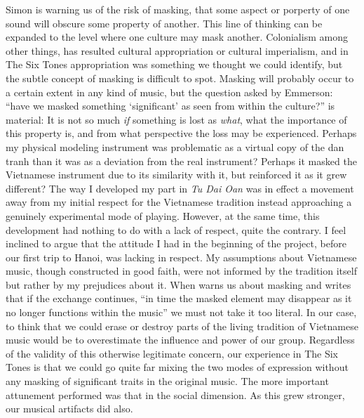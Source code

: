 \documentclass[a4paper]{article}
\begin{document}
Simon \citet{emmerson06} is warning us of the risk of masking, that some aspect or porperty of one sound will obscure some property of another. This line of thinking can be expanded to the level where one culture may mask another. Colonialism among other things, has resulted cultural appropriation or cultural imperialism, and in The Six Tones appropriation was something we thought we could identify, but the subtle concept of masking is difficult to spot.
Masking will probably occur to a certain extent in any kind of music, but the question asked by Emmerson: ``have we masked something ‘significant’ as seen from within the culture?'' is material: It is not so much \emph{if} something is lost as \emph{what}, what the importance of this property is, and from what perspective the loss may be experienced. Perhaps my physical modeling instrument was problematic as a virtual copy of the dan tranh than it was as a deviation from the real instrument? Perhaps it masked the Vietnamese instrument due to its similarity with it, but reinforced it as it grew different? 
The way I developed my part in \emph{Tu Dai Oan} was in effect a movement away from my initial respect for the Vietnamese tradition instead approaching a genuinely experimental mode of playing. However, at the same time, this development had nothing to do with a lack of respect, quite the contrary. I feel inclined to argue that the attitude I had in the beginning of the project, before our first trip to Hanoi, was lacking in respect. My assumptions about Vietnamese music, though constructed in good faith, were not informed by the tradition itself but rather by my prejudices about it.
When \citet{emmerson06} warns us about masking and writes that if the exchange continues, ``in time the masked element may disappear as it no longer functions within the music'' we must not take it too literal. In our case, to think that we could erase or destroy parts of the living tradition of Vietnamese music would be to overestimate the influence and power of our group. Regardless of the validity of this otherwise legitimate concern, our experience in The Six Tones is that we could go quite far mixing the two modes of expression without any masking of significant traits in the original music. The more important attunement performed was that in the social dimension. As this grew stronger, our musical artifacts did also.
\end{document}
